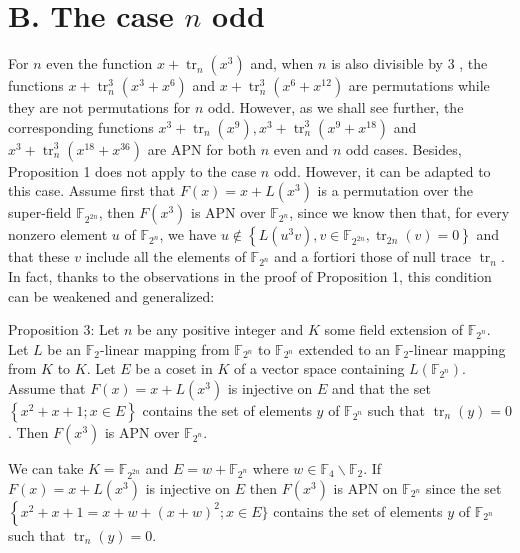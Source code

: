 \documentclass[10pt]{article}
\begin{document}
\section*{B. The case $n$ odd}
For $n$ even the function $x+\operatorname{tr}_{n}\left(x^{3}\right)$ and, when $n$ is also divisible by 3 , the functions $x+\operatorname{tr}_{n}^{3}\left(x^{3}+x^{6}\right)$ and $x+\operatorname{tr}_{n}^{3}\left(x^{6}+x^{12}\right)$ are permutations while they are not permutations for $n$ odd. However, as we shall see further, the corresponding functions $x^{3}+\operatorname{tr}_{n}\left(x^{9}\right), x^{3}+\operatorname{tr}_{n}^{3}\left(x^{9}+x^{18}\right)$ and $x^{3}+\operatorname{tr}_{n}^{3}\left(x^{18}+x^{36}\right)$ are APN for both $n$ even and $n$ odd cases. Besides, Proposition 1 does not apply to the case $n$ odd. However, it can be adapted to this case. Assume first that $F(x)=x+L\left(x^{3}\right)$ is a permutation over the super-field $\mathbb{F}_{2^{2 n}}$, then $F\left(x^{3}\right)$ is APN over $\mathbb{F}_{2^{n}}$, since we know then that, for every nonzero element $u$ of $\mathbb{F}_{2^{n}}$, we have $u \notin\left\{L\left(u^{3} v\right), v \in\right. \left.\mathbb{F}_{2^{2 n}}, \operatorname{tr}_{2 n}(v)=0\right\}$ and that these $v$ include all the elements of $\mathbb{F}_{2^{n}}$ and a fortiori those of null trace $\operatorname{tr}_{n}$. In fact, thanks to the observations in the proof of Proposition 1, this condition can be weakened and generalized:

Proposition 3: Let $n$ be any positive integer and $K$ some field extension of $\mathbb{F}_{2^{n}}$. Let $L$ be an $\mathbb{F}_{2}$-linear mapping from $\mathbb{F}_{2^{n}}$ to $\mathbb{F}_{2^{n}}$ extended to an $\mathbb{F}_{2}$-linear mapping from $K$ to $K$. Let $E$ be a coset in $K$ of a vector space containing $L\left(\mathbb{F}_{2^{n}}\right)$. Assume that $F(x)=x+L\left(x^{3}\right)$ is injective on $E$ and that the set $\left\{x^{2}+x+1 ; x \in E\right\}$ contains the set of elements $y$ of $\mathbb{F}_{2^{n}}$ such that $\operatorname{tr}_{n}(y)=0$. Then $F\left(x^{3}\right)$ is APN over $\mathbb{F}_{2^{n}}$.

We can take $K=\mathbb{F}_{2^{2 n}}$ and $E=w+\mathbb{F}_{2^{n}}$ where $w \in \mathbb{F}_{4} \backslash \mathbb{F}_{2}$. If $F(x)=x+L\left(x^{3}\right)$ is injective on $E$ then $F\left(x^{3}\right)$ is APN on $\mathbb{F}_{2^{n}}$ since the set $\left\{x^{2}+x+1=x+w+(x+w)^{2} ; x \in\right. E\}$ contains the set of elements $y$ of $\mathbb{F}_{2^{n}}$ such that $\operatorname{tr}_{n}(y)=0$.
\end{document}
